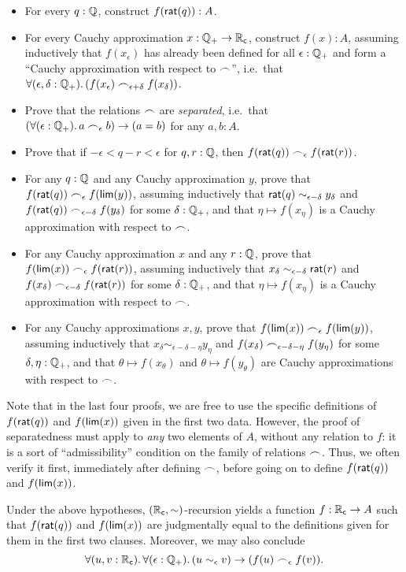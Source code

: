\begin{itemize}
\item For every $q : \mathbb{Q}$, construct $f(\mathsf{rat}(q)) : A$.
\item For every Cauchy approximation $x : \mathbb{Q}_{+} \to \mathbb{R}_\mathsf{c}$, construct $f(x) : A$, assuming inductively that $f(x_\epsilon)$ has already been defined for all $\epsilon : \mathbb{Q}_{+}$ and form a ``Cauchy approximation with respect to $\frown$'', i.e.\ that $\fall{\epsilon,\delta:\Qp} (f(x_\epsilon) \bsim_{\epsilon+\delta} f(x_\delta))$.
\item Prove that the relations $\frown$ are \emph{separated}, i.e.\ that $(\fall{\epsilon:\Qp} a\bsim_\epsilon b) \to (a=b)$ for any $a,b:A$.
\item Prove that if $-\epsilon< q-r <\epsilon$ for $q,r:\mathbb{Q}$, then $f(\mathsf{rat}(q))\frown_\epsilon f(\mathsf{rat}(r))$.
\item For any $q:\mathbb{Q}$ and any Cauchy approximation $y$, prove that $f(\mathsf{rat}(q)) \frown_\epsilon f(\mathsf{lim}(y))$, assuming inductively that $\mathsf{rat}(q)\sim_{\epsilon-\delta} y_\delta$ and $f(\mathsf{rat}(q)) \frown_{\epsilon-\delta} f(y_\delta)$ for some $\delta:\mathbb{Q}_{+}$, and that $\eta \mapsto f(x_\eta)$ is a Cauchy approximation with respect to $\frown$.
\item For any Cauchy approximation $x$ and any $r:\mathbb{Q}$, prove that $f(\mathsf{lim}(x)) \frown_\epsilon f(\mathsf{rat}(r))$, assuming inductively that $x_\delta \sim_{\epsilon-\delta} \mathsf{rat}(r)$ and $f(x_\delta) \frown_{\epsilon-\delta} f(\mathsf{rat}(r))$ for some $\delta:\mathbb{Q}_{+}$, and that $\eta\mapsto f(x_\eta)$ is a Cauchy approximation with respect to $\frown$.
\item For any Cauchy approximations $x,y$, prove that $f(\mathsf{lim}(x)) \frown_\epsilon f(\mathsf{lim}(y))$, assuming inductively that $x_\delta \sim_{\epsilon-\delta-\eta} y_\eta$ and $f(x_\delta) \frown_{\epsilon-\delta-\eta} f(y_\eta)$ for some $\delta,\eta:\mathbb{Q}_{+}$, and that $\theta\mapsto f(x_\theta)$ and $\theta\mapsto f(y_\theta)$ are Cauchy approximations with respect to $\frown$.
\end{itemize}
Note that in the last four proofs, we are free to use the specific definitions of $f(\mathsf{rat}(q))$ and $f(\mathsf{lim}(x))$ given in the first two data.
However, the proof of separatedness must apply to \emph{any} two elements of $A$, without any relation to $f$: it is a sort of ``admissibility'' condition on the family of relations $\frown$.
Thus, we often verify it first, immediately after defining $\frown$, before going on to define $f(\mathsf{rat}(q))$ and $f(\mathsf{lim}(x))$.

Under the above hypotheses, $(\mathbb{R}_\mathsf{c},\sim)$-recursion yields a function $f:\mathbb{R}_\mathsf{c}\to A$ such that $f(\mathsf{rat}(q))$ and $f(\mathsf{lim}(x))$ are judgmentally equal to the definitions given for them in the first two clauses.
Moreover, we may also conclude
\begin{equation}
  \fall{u,v:\RC}{\epsilon:\Qp} (u\sim_\epsilon v) \to (f(u) \bsim_\epsilon f(v)).\label{eq:RC-sim-recursion-extra}
\end{equation}

